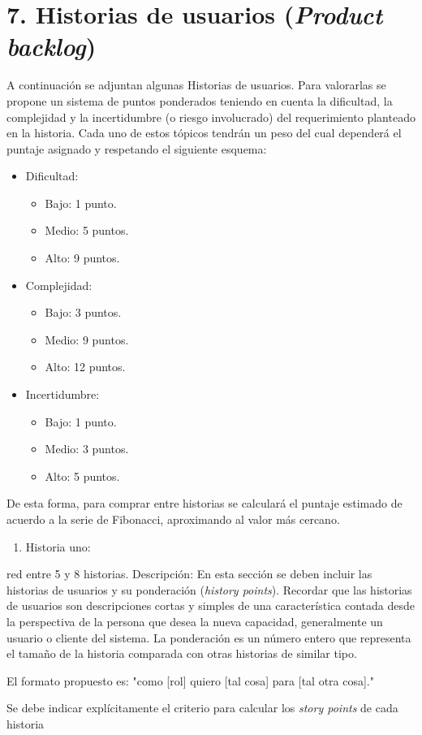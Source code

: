 \documentclass[
11pt, %
]{charter}
\begin{document}
\section{7. Historias de usuarios (\textit{Product backlog})}
\label{sec:backlog}

A continuación se adjuntan algunas Historias de usuarios. Para valorarlas se propone un sistema de puntos ponderados teniendo en cuenta la dificultad, la complejidad y la incertidumbre (o riesgo involucrado) del requerimiento planteado en la historia. Cada uno de estos tópicos tendrán un peso del cual dependerá el puntaje asignado y respetando el siguiente esquema:
\begin{itemize}
	\item Dificultad:
	\begin{itemize}
		\item Bajo: 1 punto.
		\item Medio: 5 puntos.
		\item Alto: 9 puntos.
	\end{itemize}
	\item Complejidad:
	\begin{itemize}
		\item Bajo: 3 puntos.
		\item Medio: 9 puntos.
		\item Alto: 12 puntos.
	\end{itemize}
	\item Incertidumbre:
	\begin{itemize}
		\item Bajo: 1 punto.
		\item Medio: 3 puntos.
		\item Alto: 5 puntos.
	\end{itemize}
\end{itemize}
De esta forma, para comprar entre historias se calculará el puntaje estimado de acuerdo a la serie de Fibonacci, aproximando al valor más cercano.
\begin{enumerate}
	\item Historia uno:
\end{enumerate}

\begin{consigna}{red}
entre 5 y 8 historias.
Descripción: En esta sección se deben incluir las historias de usuarios y su ponderación (\textit{history points}). Recordar que las historias de usuarios son descripciones cortas y simples de una característica contada desde la perspectiva de la persona que desea la nueva capacidad, generalmente un usuario o cliente del sistema. La ponderación es un número entero que representa el tamaño de la historia comparada con otras historias de similar tipo.

El formato propuesto es: "como [rol] quiero [tal cosa] para [tal otra cosa]."

Se debe indicar explícitamente el criterio para calcular los \textit{story points} de cada historia
\end{consigna}
\end{document}
